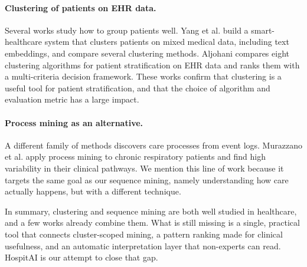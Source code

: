 \paragraph{Clustering of patients on EHR data.}
Several works study how to group patients well. Yang et al. \cite{yang2024} build a smart-healthcare system that clusters patients on mixed medical data, including text embeddings, and compare several clustering methods. Aljohani \cite{aljohani2024} compares eight clustering algorithms for patient stratification on EHR data and ranks them with a multi-criteria decision framework. These works confirm that clustering is a useful tool for patient stratification, and that the choice of algorithm and evaluation metric has a large impact.

\paragraph{Process mining as an alternative.}
A different family of methods discovers care processes from event logs. Murazzano et al. \cite{murazzano2026} apply process mining to chronic respiratory patients and find high variability in their clinical pathways. We mention this line of work because it targets the same goal as our sequence mining, namely understanding how care actually happens, but with a different technique.

In summary, clustering and sequence mining are both well studied in healthcare, and a few works already combine them. What is still missing is a single, practical tool that connects cluster-scoped mining, a pattern ranking made for clinical usefulness, and an automatic interpretation layer that non-experts can read. HospitAI is our attempt to close that gap.
